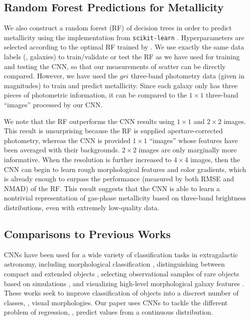 \documentclass[fleqn,usenatbib]{mnras}
\begin{document}
\subsection{Random Forest Predictions for Metallicity}
We also construct a random forest (RF) of decision trees in order to predict metallicity using the implementation from \texttt{scikit-learn} \citep{Pedregosa2012}. Hyperparameters are selected according to the optimal RF trained by \cite{Acquaviva2016}. We use exactly the same data labels (\ie, galaxies) to train/validate or test the RF as we have used for training and testing the CNN, so that our measurements of scatter can be directly compared. However, we have used the $gri$ three-band photometry data (given in magnitudes) to train and predict metallicity. Since each galaxy only has three pieces of photometric information, it can be compared to the $1 \times 1$ three-band ``images'' processed by our CNN.

We note that the RF outperforms the CNN results using $1\times 1$ and $2 \times 2$ images.
This result is unsurprising because the RF is supplied aperture-corrected photometry, whereas the CNN is provided $1 \times 1 $ \sdssi\sdssr\sdssg ``images'' whose features have been averaged with their backgrounds. $2 \times 2$ images are only marginally more informative. When the resolution is further increased to $4 \times 4$ images, then the CNN can begin to learn rough morphological features and color gradients, which is already enough to surpass the performance (measured by both RMSE and NMAD) of the RF.
This result suggests that the CNN is able to learn a nontrivial representation of gas-phase metallicity based on three-band brightness distributions, even with extremely low-quality data.

\subsection{Comparisons to Previous Works}\label{sec:previous work}
CNNs have been used for a wide variety of classification tasks in extragalactic astronomy, including morphological classification , distinguishing between compact and extended objects \citep{Kim2017}, selecting observational samples of rare objects based on simulations \citep{Huertas-Company2018, Lanusse2017}, and visualizing high-level morphological galaxy features \citep{Dai2018}. These works seek to improve classification of objects into a discreet number of classes, \ie, visual morphologies. Our paper uses CNNs to tackle the different problem of regression, \ie, predict values from a continuous distribution.
\end{document}
